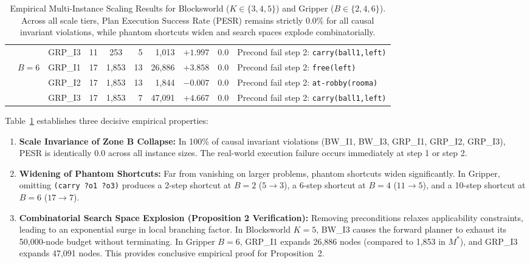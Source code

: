 \documentclass[11pt,a4paper]{article}
\theoremstyle{definition}
\begin{document}
\begin{table}[h!]
\begin{tabular}{llrccrrcrl}
                     &       & GRP\_I3 & 11 & 253 & 5 & 1,013 & $+1.997$ & 0.0 & Precond fail step 2: \texttt{carry(ball1,left)} \\
\cmidrule{2-10}
                     & $B=6$ & GRP\_I1 & 17 & 1,853 & 13 & 26,886 & $+3.858$ & 0.0 & Precond fail step 2: \texttt{free(left)} \\
                     &       & GRP\_I2 & 17 & 1,853 & 13 & 1,844 & $-0.007$ & 0.0 & Precond fail step 2: \texttt{at-robby(rooma)} \\
                     &       & GRP\_I3 & 17 & 1,853 & 7 & 47,091 & $+4.667$ & 0.0 & Precond fail step 2: \texttt{carry(ball1,left)} \\
\bottomrule
\end{tabular}
\caption{Empirical Multi-Instance Scaling Results for Blocksworld ($K \in \{3,4,5\}$) and Gripper ($B \in \{2,4,6\}$). Across all scale tiers, Plan Execution Success Rate (PESR) remains strictly 0.0\% for all causal invariant violations, while phantom shortcuts widen and search spaces explode combinatorially.}
\label{tab:scaling_results}
\end{table}

Table~\ref{tab:scaling_results} establishes three decisive empirical properties:
\begin{enumerate}[leftmargin=*]
    \item \textbf{Scale Invariance of Zone B Collapse:} In 100\% of causal invariant violations (BW\_I1, BW\_I3, GRP\_I1, GRP\_I2, GRP\_I3), PESR is identically 0.0 across all instance sizes. The real-world execution failure occurs immediately at step 1 or step 2.
    \item \textbf{Widening of Phantom Shortcuts:} Far from vanishing on larger problems, phantom shortcuts widen significantly. In Gripper, omitting \texttt{(carry ?o1 ?o3)} produces a 2-step shortcut at $B=2$ ($5 \to 3$), a 6-step shortcut at $B=4$ ($11 \to 5$), and a 10-step shortcut at $B=6$ ($17 \to 7$).
    \item \textbf{Combinatorial Search Space Explosion (Proposition 2 Verification):} Removing preconditions relaxes applicability constraints, leading to an exponential surge in local branching factor. In Blocksworld $K=5$, BW\_I3 causes the forward planner to exhaust its 50,000-node budget without terminating. In Gripper $B=6$, GRP\_I1 expands 26,886 nodes (compared to 1,853 in $M^*$), and GRP\_I3 expands 47,091 nodes. This provides conclusive empirical proof for Proposition~2.
\end{enumerate}
\end{document}
